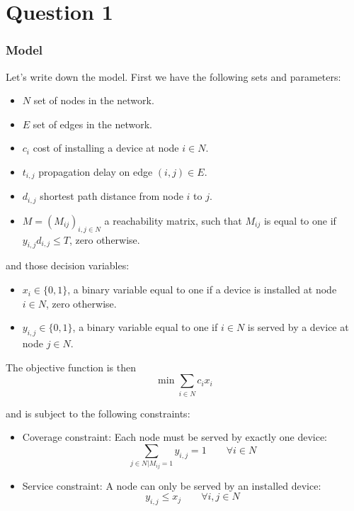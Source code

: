 \section{Question 1}

\subsubsection*{Model}
Let's write down the model. First we have the following sets and parameters:
\begin{itemize}
	\item $N$ set of nodes in the network.
	\item $E$ set of edges in the network.
	\item $c_i$ cost of installing a device at node $i \in N$.
	\item $t_{i,j}$ propagation delay on edge $(i,j) \in E$.
	\item $d_{i,j}$ shortest path distance from node $i$ to $j$.
	\item $M = (M_{ij})_{i,j \in N}$ a reachability matrix, such that $M_{ij}$ is equal to one if $y_{i,j} d_{i,j} \le T$, zero otherwise.
\end{itemize}

and those decision variables:
\begin{itemize}
	\item $x_i \in \{0,1\}$, a binary variable equal to one if a device is installed at node $i \in N$, zero otherwise.
	\item $y_{i,j} \in \{0,1\}$, a binary variable equal to one if $i \in N$ is served by a device at node $j \in N$.

\end{itemize}

The objective function is then
\begin{equation}
	\min \sum_{i \in N} c_i x_i
\end{equation}

and is subject to the following constraints:
\begin{itemize}
	\item Coverage constraint: Each node must be served by exactly one device:
	\[
		\sum_{j \in N | M_{ij}=1} y_{i,j} = 1 \qquad \forall i \in N
	\]
	\item Service constraint: A node can only be served by an installed device:
	\[
		y_{i,j} \le x_j \qquad \forall i,j \in N
	\]
	
\end{itemize}

